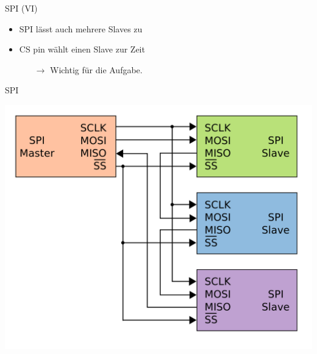   \begin{frame} {SPI (VI)}
    \begin{block} {}
    \begin{itemize}
      \item SPI lässt auch mehrere Slaves zu
      \item CS pin wählt einen Slave zur Zeit
      \begin{itemize}
        \item[$\rightarrow$] Wichtig für die Aufgabe.
      \end{itemize}
    \end{itemize}
  \end{block}
  \end{frame}

  \begin{frame} {SPI}
    \begin{center}
      \includegraphics[height=.8\textheight]{figs/SPI-daisychain}
    \end{center}
  \end{frame}


